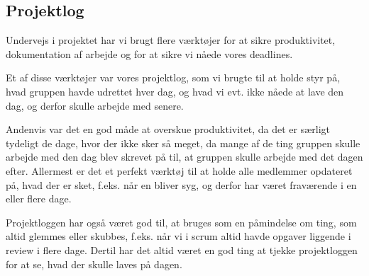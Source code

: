 \subsection{Projektlog}

Undervejs i projektet har vi brugt flere værktøjer for at sikre produktivitet, dokumentation af arbejde og for at sikre vi nåede vores deadlines.

Et af disse værktøjer var vores projektlog, som vi brugte til at holde styr på, hvad gruppen havde udrettet hver dag, og hvad vi evt. ikke nåede at lave den dag, og derfor skulle arbejde med senere.

Andenvis var det en god måde at overskue produktivitet, da det er særligt tydeligt de dage, hvor der ikke sker så meget, da mange af de ting gruppen skulle arbejde med den dag blev skrevet på til, at gruppen skulle arbejde med det dagen efter.
Allermest er det et perfekt værktøj til at holde alle medlemmer opdateret på, hvad der er sket, f.eks. når en bliver syg, og derfor har været fraværende i en eller flere dage.

Projektloggen har også været god til, at bruges som en påmindelse om ting, som altid glemmes eller skubbes, f.eks. når vi i scrum altid havde opgaver liggende i review i flere dage.
Dertil har det altid været en god ting at tjekke projektloggen for at se, hvad der skulle laves på dagen.